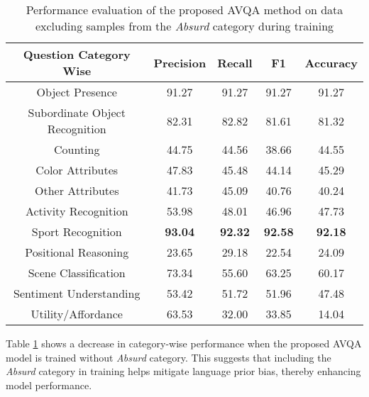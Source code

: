 \documentclass[runningheads]{llncs}
\begin{document}
\begin{table}[!t]
\centering
\caption{Performance evaluation of the proposed AVQA method on data excluding samples from the \emph{Absurd} category during training}
\label{without_absurd}
\begin{tabular}{|c|c|c|c|c|}
\toprule
{\textbf{Question Category Wise}}           & {\textbf{Precision}} & {\textbf{Recall}} & {\textbf{F1}}    & {\textbf{Accuracy}} \\
\hline
Object Presence               &  91.27    &  91.27  & 91.27  & 91.27    \\ \hline
Subordinate Object Recognition              & 82.31 & 82.82 &  81.61  & 81.32   \\ \hline
Counting               & 44.75 &	44.56 &	38.66	& 44.55 \\ \hline
Color Attributes    &      47.83 & 45.48 & 44.14 &   45.29 \\ \hline
Other Attributes &	41.73 &	45.09 & 40.76 &  40.24	   \\ \hline
Activity Recognition           &       53.98  & 48.01  & 46.96    & 47.73\\ \hline
Sport Recognition              & {\textbf{93.04}} & {\textbf{92.32}} & {\textbf{92.58}}  &{\textbf{92.18}}   \\ \hline
Positional Reasoning          & 23.65 &	29.18 &	 22.54	&  24.09   \\ \hline
Scene Classification           & 73.34    & 55.60 & 63.25 & 60.17  \\ \hline
Sentiment Understanding &   53.42	& 51.72 &	51.96 &	 47.48  \\ \hline
Utility/Affordance    & 63.53      & 32.00     &  33.85 &  14.04   \\
\hline
\end{tabular}
\end{table}    
Table \ref{without_absurd} shows a decrease in category-wise performance when the proposed AVQA model is trained without \emph{Absurd} category. This suggests that including the \emph{Absurd} category in training helps mitigate language prior bias, thereby enhancing model performance. 
\end{document}
